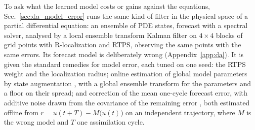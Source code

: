 To ask what the learned model costs or
gains against the equations, Sec.~\ref{sec:da_model_error} runs the same
kind of filter in the physical space of a partial differential equation:
an ensemble of PDE states, forecast with a spectral solver, analysed by a
local ensemble transform Kalman filter on $4\times4$ blocks of grid points
with R-localization and RTPS, observing the same points with the same
errors. Its forecast model is deliberately wrong (Appendix~\ref{app:da}).
It is given the standard remedies for model error, each tuned on one
seed: the RTPS weight and the localization radius; online estimation of
global model parameters by state augmentation
\citep{anderson2001,ruiz2013}, with a global ensemble transform for the
parameters and a floor on their spread; and correction of the mean
one-cycle forecast error, with additive noise drawn from the covariance of
the remaining error \citep{dee2005}, both estimated offline from
$r = u(t+T)-M\big(u(t)\big)$ on an independent trajectory, where $M$ is the
wrong model and $T$ one assimilation cycle.
